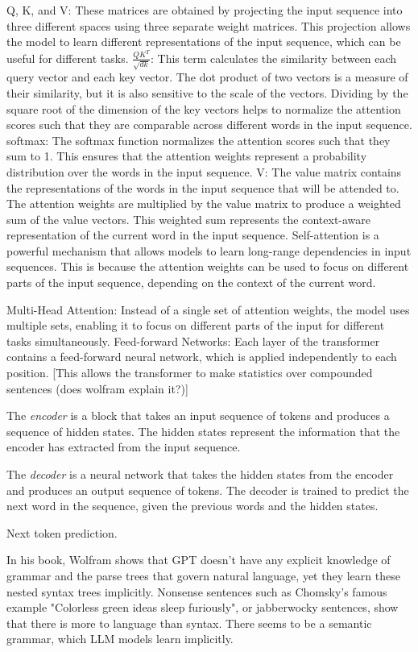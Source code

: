 Q, K, and V: These matrices are obtained by projecting the input sequence into three different spaces using three separate weight matrices. This projection allows the model to learn different representations of the input sequence, which can be useful for different tasks.
$\frac{QK^T}{\sqrt{dk}}$: This term calculates the similarity between each query vector and each key vector. The dot product of two vectors is a measure of their similarity, but it is also sensitive to the scale of the vectors. Dividing by the square root of the dimension of the key vectors helps to normalize the attention scores such that they are comparable across different words in the input sequence.
softmax: The softmax function normalizes the attention scores such that they sum to 1. This ensures that the attention weights represent a probability distribution over the words in the input sequence.
V: The value matrix contains the representations of the words in the input sequence that will be attended to. The attention weights are multiplied by the value matrix to produce a weighted sum of the value vectors. This weighted sum represents the context-aware representation of the current word in the input sequence.
Self-attention is a powerful mechanism that allows models to learn long-range dependencies in input sequences. This is because the attention weights can be used to focus on different parts of the input sequence, depending on the context of the current word.

Multi-Head Attention: Instead of a single set of attention weights, the model uses multiple sets, enabling it to focus on different parts of the input for different tasks simultaneously.
Feed-forward Networks: Each layer of the transformer contains a feed-forward neural network, which is applied independently to each position. [This allows the transformer to make statistics over compounded sentences (does wolfram explain it?)]

The \emph{encoder} is a block that takes an input sequence of tokens and produces a sequence of hidden states. The hidden states represent the information that the encoder has extracted from the input sequence.

The \emph{decoder} is a neural network that takes the hidden states from the encoder and produces an output sequence of tokens. The decoder is trained to predict the next word in the sequence, given the previous words and the hidden states.

Next token prediction.

In his book, Wolfram shows that GPT doesn't have any explicit knowledge of grammar and the parse trees that govern natural language, yet they learn these nested syntax trees implicitly. 
Nonsense sentences such as Chomsky's famous example "Colorless green ideas sleep furiously", or jabberwocky sentences, show that there is more to language than syntax. There seems to be a semantic grammar, which LLM models learn implicitly.

